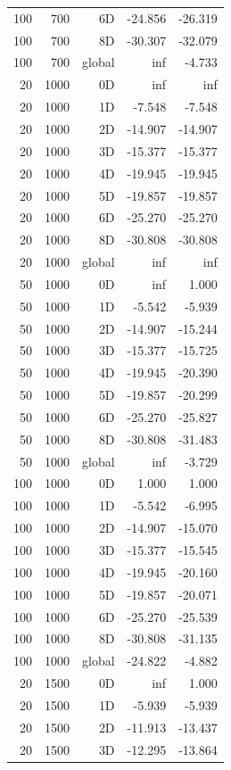 \begin{longtable}{rrrrr}
100 & 700 & 6D & -24.856 & -26.319 \\
100 & 700 & 8D & -30.307 & -32.079 \\
100 & 700 & global & inf & -4.733 \\
20 & 1000 & 0D & inf & inf \\
20 & 1000 & 1D & -7.548 & -7.548 \\
20 & 1000 & 2D & -14.907 & -14.907 \\
20 & 1000 & 3D & -15.377 & -15.377 \\
20 & 1000 & 4D & -19.945 & -19.945 \\
20 & 1000 & 5D & -19.857 & -19.857 \\
20 & 1000 & 6D & -25.270 & -25.270 \\
20 & 1000 & 8D & -30.808 & -30.808 \\
20 & 1000 & global & inf & inf \\
50 & 1000 & 0D & inf & 1.000 \\
50 & 1000 & 1D & -5.542 & -5.939 \\
50 & 1000 & 2D & -14.907 & -15.244 \\
50 & 1000 & 3D & -15.377 & -15.725 \\
50 & 1000 & 4D & -19.945 & -20.390 \\
50 & 1000 & 5D & -19.857 & -20.299 \\
50 & 1000 & 6D & -25.270 & -25.827 \\
50 & 1000 & 8D & -30.808 & -31.483 \\
50 & 1000 & global & inf & -3.729 \\
100 & 1000 & 0D & 1.000 & 1.000 \\
100 & 1000 & 1D & -5.542 & -6.995 \\
100 & 1000 & 2D & -14.907 & -15.070 \\
100 & 1000 & 3D & -15.377 & -15.545 \\
100 & 1000 & 4D & -19.945 & -20.160 \\
100 & 1000 & 5D & -19.857 & -20.071 \\
100 & 1000 & 6D & -25.270 & -25.539 \\
100 & 1000 & 8D & -30.808 & -31.135 \\
100 & 1000 & global & -24.822 & -4.882 \\
20 & 1500 & 0D & inf & 1.000 \\
20 & 1500 & 1D & -5.939 & -5.939 \\
20 & 1500 & 2D & -11.913 & -13.437 \\
20 & 1500 & 3D & -12.295 & -13.864 \\

\end{longtable}
